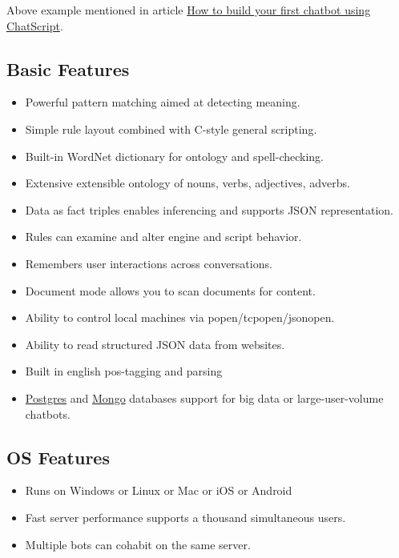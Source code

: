 \documentclass[]{article}
\providecommand{\tightlist}{%
  \setlength{\itemsep}{0pt}\setlength{\parskip}{0pt}}
\begin{document}
Above example mentioned in article
\href{https://medium.freecodecamp.com/chatscript-for-beginners-chatbots-developers-c58bb591da8\#.2qdxjuyvs}{How
to build your first chatbot using ChatScript}.

\subsection{Basic Features}\label{basic-features}

\begin{itemize}
\tightlist
\item
  Powerful pattern matching aimed at detecting meaning.
\item
  Simple rule layout combined with C-style general scripting.
\item
  Built-in WordNet dictionary for ontology and spell-checking.
\item
  Extensive extensible ontology of nouns, verbs, adjectives, adverbs.
\item
  Data as fact triples enables inferencing and supports JSON
  representation.
\item
  Rules can examine and alter engine and script behavior.
\item
  Remembers user interactions across conversations.
\item
  Document mode allows you to scan documents for content.
\item
  Ability to control local machines via popen/tcpopen/jsonopen.
\item
  Ability to read structured JSON data from websites.
\item
  Built in english pos-tagging and parsing
\item
  \href{https://www.postgresql.org/}{Postgres} and
  \href{https://www.mongodb.com/}{Mongo} databases support for big data
  or large-user-volume chatbots.
\end{itemize}

\subsection{OS Features}\label{os-features}

\begin{itemize}
\tightlist
\item
  Runs on Windows or Linux or Mac or iOS or Android
\item
  Fast server performance supports a thousand simultaneous users.
\item
  Multiple bots can cohabit on the same server.
\end{itemize}
\end{document}
